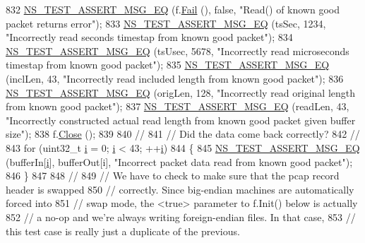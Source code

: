 \begin{DoxyCode}
832   \hyperlink{group__testing_ga2a9d78cffb3db8e867c35fff0b698cf5}{NS\_TEST\_ASSERT\_MSG\_EQ} (f.\hyperlink{classns3_1_1PcapFile_a2e00aa080890a0c9c3e9f5bd2d6c21d5}{Fail} (), \textcolor{keyword}{false}, \textcolor{stringliteral}{"Read() of known good packet returns
       error"});
833   \hyperlink{group__testing_ga2a9d78cffb3db8e867c35fff0b698cf5}{NS\_TEST\_ASSERT\_MSG\_EQ} (tsSec, 1234, \textcolor{stringliteral}{"Incorrectly read seconds timestap from known
       good packet"});
834   \hyperlink{group__testing_ga2a9d78cffb3db8e867c35fff0b698cf5}{NS\_TEST\_ASSERT\_MSG\_EQ} (tsUsec, 5678, \textcolor{stringliteral}{"Incorrectly read microseconds timestap from
       known good packet"});
835   \hyperlink{group__testing_ga2a9d78cffb3db8e867c35fff0b698cf5}{NS\_TEST\_ASSERT\_MSG\_EQ} (inclLen, 43, \textcolor{stringliteral}{"Incorrectly read included length from known
       good packet"});
836   \hyperlink{group__testing_ga2a9d78cffb3db8e867c35fff0b698cf5}{NS\_TEST\_ASSERT\_MSG\_EQ} (origLen, 128, \textcolor{stringliteral}{"Incorrectly read original length from known
       good packet"});
837   \hyperlink{group__testing_ga2a9d78cffb3db8e867c35fff0b698cf5}{NS\_TEST\_ASSERT\_MSG\_EQ} (readLen, 43, \textcolor{stringliteral}{"Incorrectly constructed actual read length from
       known good packet given buffer size"});
838   f.\hyperlink{classns3_1_1PcapFile_ad3b6c28d464742ee1fa3a64628339a5b}{Close} ();
839 
840   \textcolor{comment}{//}
841   \textcolor{comment}{// Did the data come back correctly?}
842   \textcolor{comment}{//}
843   \textcolor{keywordflow}{for} (uint32\_t \hyperlink{bernuolliDistribution_8m_a6f6ccfcf58b31cb6412107d9d5281426}{i} = 0; \hyperlink{bernuolliDistribution_8m_a6f6ccfcf58b31cb6412107d9d5281426}{i} < 43; ++\hyperlink{bernuolliDistribution_8m_a6f6ccfcf58b31cb6412107d9d5281426}{i})
844     \{
845       \hyperlink{group__testing_ga2a9d78cffb3db8e867c35fff0b698cf5}{NS\_TEST\_ASSERT\_MSG\_EQ} (bufferIn[\hyperlink{bernuolliDistribution_8m_a6f6ccfcf58b31cb6412107d9d5281426}{i}], bufferOut[i], \textcolor{stringliteral}{"Incorrect packet data read
       from known good packet"});
846     \}
847 
848   \textcolor{comment}{//}
849   \textcolor{comment}{// We have to check to make sure that the pcap record header is swapped }
850   \textcolor{comment}{// correctly.  Since big-endian machines are automatically forced into }
851   \textcolor{comment}{// swap mode, the <true> parameter to f.Init() below is actually}
852   \textcolor{comment}{// a no-op and we're always writing foreign-endian files.  In that case, }
853   \textcolor{comment}{// this test case is really just a duplicate of the previous.}

\end{DoxyCode}
